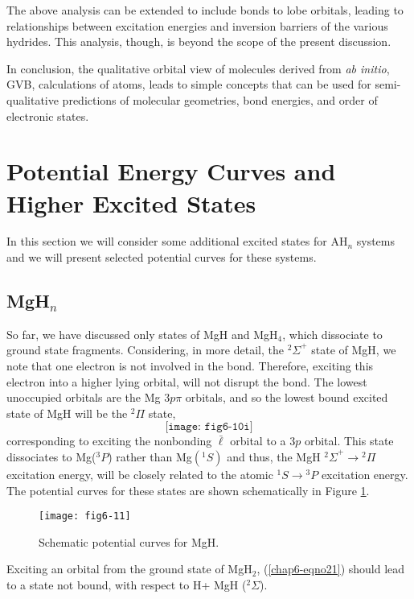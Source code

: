 The above analysis can be extended to include bonds to lobe orbitals, 
leading to relationships between excitation energies and inversion 
barriers of the various hydrides. This analysis, though, is beyond 
the scope of the present discussion.

In conclusion, the qualitative orbital view of molecules derived 
from {\it ab initio}, GVB, calculations of 
atoms, leads to simple concepts that can be used for semi-qualitative 
predictions of molecular geometries, bond energies, and order of 
electronic states.

\section{Potential Energy Curves and Higher Excited States}

In this section we will consider some additional excited states for
AH$_n$ systems and we will present selected potential curves for these systems.

\subsection{MgH$_n$}

So far, we have discussed only states of MgH and MgH$_4$, which dissociate
to ground state fragments. Considering, in more detail, the 
${^2\Sigma}^+$ state of MgH, we	note that one electron is not involved 
in the bond.  Therefore, exciting this electron into a higher lying orbital, 
will not disrupt the bond. The lowest unoccupied orbitals are the Mg 
$3p \pi$ orbitals, and
so the lowest bound excited state of MgH will be the ${^2\Pi}$ state,
\begin{equation}
\texttt{[image: fig6-10i]}
\end{equation}
corresponding to exciting the nonbonding ${\bar{\ell}}$ orbital to a $3p$ 
orbital. This state dissociates to Mg(${^3P}$) rather than 
Mg$({^1S})$ and thus, the MgH ${^2\Sigma}^+
\rightarrow {^2\Pi}$ excitation energy, will be closely related to 
the atomic ${^1S} \rightarrow {^3P}$ excitation energy.  The potential 
curves for these states are shown schematically in Figure \ref{chap6-fig12}.

\begin{figure}
\texttt{[image: fig6-11]}
\caption{Schematic potential curves for MgH.}
\label{chap6-fig12}
\end{figure}

Exciting an orbital from the ground state of MgH$_2$,
(\ref{chap6-eqno21}) should lead to a state not bound, with respect to
H$ $+ MgH (${^2\Sigma}$).

